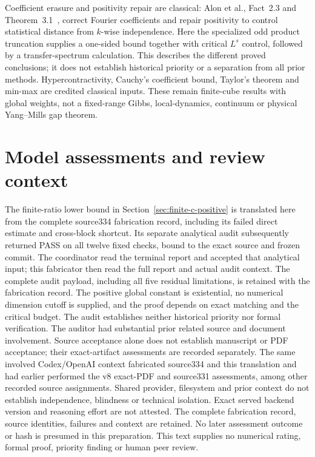 \documentclass[11pt]{article}
\begin{document}
Coefficient erasure and positivity repair are classical: Alon et al.,
Fact~2.3 and Theorem~3.1~\cite{alon-kwise}, correct Fourier coefficients
and repair positivity to control statistical distance from $k$-wise
independence. Here the specialized odd product truncation supplies a
one-sided bound together with critical $L^s$ control, followed by a
transfer-spectrum calculation. This describes the different proved
conclusions; it does not establish historical priority or a separation
from all prior methods. Hypercontractivity, Cauchy's coefficient bound,
Taylor's theorem and min-max are credited classical inputs. These remain
finite-cube results with global weights, not a fixed-range Gibbs,
local-dynamics, continuum or physical Yang--Mills gap theorem.


\section*{Model assessments and review context}
The finite-ratio lower bound in Section~\ref{sec:finite-c-positive}
is translated here from the complete source334 fabrication record,
including its failed direct estimate and cross-block shortcut. Its separate
analytical audit subsequently returned PASS on all twelve fixed checks,
bound to the exact source and frozen commit. The coordinator read the
terminal report and accepted that analytical input; this fabricator then
read the full report and actual audit context. The complete audit payload,
including all five residual limitations, is retained with the fabrication
record. The positive global constant is existential, no numerical dimension
cutoff is supplied, and the proof depends on exact matching and the critical
budget. The audit establishes neither historical priority nor formal
verification. The auditor had substantial prior related source and document
involvement. Source acceptance alone does not establish manuscript or PDF acceptance;
their exact-artifact assessments are recorded separately.
The same involved Codex/OpenAI context fabricated source334 and this
translation and had earlier performed the v8 exact-PDF and source331
assessments, among other recorded source assignments. Shared provider,
filesystem and prior context do not establish independence, blindness or
technical isolation. Exact served backend version and reasoning effort
are not attested. The complete fabrication record, source identities,
failures and context are retained. No later assessment outcome or hash
is presumed in this preparation. This text supplies no numerical
rating, formal proof, priority finding or human peer review.
\end{document}
